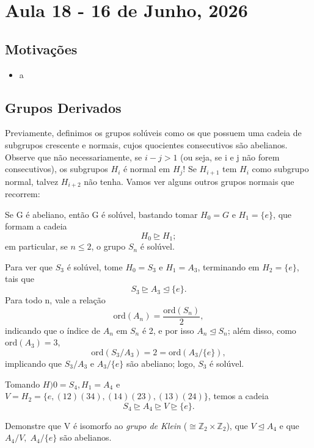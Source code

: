 \documentclass[../algebraIII_notes.tex]{subfiles}
\begin{document}
\section{Aula 18 - 16 de Junho, 2026}
\subsection{Motivações}
\begin{itemize}
	\item a
\end{itemize}
\subsection{Grupos Derivados}
Previamente, definimos os grupos solúveis como os que possuem uma cadeia de subgrupos crescente e normais, cujos quocientes consecutivos são abelianos. Observe que não necessariamente, se \(i-j>1\) (ou seja, se i e j não forem consecutivos), os subgrupos \(H_{i}\) é normal em \(H_{j}\)! Se \(H_{i+1}\) tem \(H_{i}\) como subgrupo normal, talvez \(H_{i+2}\) não tenha.
Vamos ver alguns outros grupos normais que recorrem:
\begin{example}
	Se G é abeliano, então G é solúvel, bastando tomar \(H_{0} = G\) e \(H_{1} = \{e\}\), que formam a cadeia
	\[
		H_{0} \trianglerighteq H_1;
	\]
	em particular, se \(n\leq 2\), o grupo \(S_{n}\) é solúvel.
\end{example}
\begin{example}
	Para ver que \(S_3\) é solúvel, tome \(H_{0} = S_3\) e \(H_1 = A_{3}\), terminando em \(H_2 = \{e\}\), tais que
	\[
		S_3 \trianglerighteq A_3 \trianglelefteq \{e\}.
	\]
	Para todo n, vale a relação
	\[
		\mathrm{ord}(A_{n}) = \frac{\mathrm{ord}(S_{n})}{2},
	\]
	indicando que o índice de \(A_{n}\) em \(S_{n}\) é 2, e por isso \(A_{n}\trianglelefteq S_{n}\); além disso, como \(\mathrm{ord}(A_3) = 3\),
	\[
		\mathrm{ord}(S_3/A_3) = 2 = \mathrm{ord}(A_3/\{e\}),
	\]
	implicando que \(S_3/A_3\) e \(A_3/\{e\}\) são abeliano; logo, \(S_3\) é solúvel.
\end{example}
\begin{example}
	Tomando \(H)0 = S_4, H_1 = A_4 \)  e \(V = H_2 = \{e, (12)(34), (14)(23), (13)(24)\}\), temos a cadeia
	\[
		S_4 \trianglerighteq A_4\trianglerighteq V\trianglerighteq \{e\}.
	\]
	\begin{exr}
		Demonstre que V é isomorfo ao \textit{grupo de Klein} (\(\cong \mathbb{Z}_2 \times \mathbb{Z}_2\)), que \(V \trianglelefteq A_4\) e que \(A_4/V,\; A_4/\{e\}\) são abelianos.
	\end{exr}
\end{example}
\end{document}
